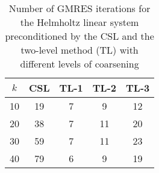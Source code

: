 \begin{table}[t]
\centering
\begin{tabular}{ccccc}
\hline
$k$ & CSL & TL-1 & TL-2 & TL-3 \\ \hline
10 & 19 & 7 & 9 & 12 \\
20 & 38 & 7 & 11 & 20 \\
30 & 59 & 7 & 11 & 23 \\
40 & 79 & 6 & 9 & 19 \\
\hline
\end{tabular}
\caption{Number of GMRES iterations for the Helmholtz linear system preconditioned by the  CSL and the two-level method (TL) with different levels of coarsening}
\label{table:gmres_csl_vs_adef_coarse_eps_20}
\end{table}
